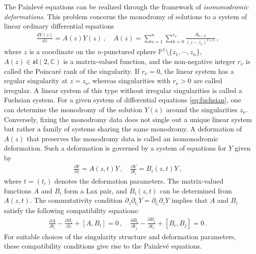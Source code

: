 \documentclass[11pt, a4paper]{article}
\theoremstyle{definition}
\begin{document}
The Painlev\'e equations can be realized through the framework of \emph{isomonodromic deformations}. This problem concerns the monodromy of solutions to a system of linear ordinary differential equations
\begin{align}\label{eq:fuchsian}
    \frac{dY(z)}{dz} = A(z) Y(z) \, , \quad
    A(z) = \sum_{\nu=1}^n \sum_{k=0}^{r_\nu} \frac{A_{\nu,-k}}{(z-z_\nu)^{k+1}} \, ,
\end{align}
where $ z $ is a coordinate on the $ n $-punctured sphere $ \mathbb{P}^1\setminus \{z_1,\cdots,z_n\} $, $ A(z) \in \mathfrak{sl}(2,\mathbb{C}) $ is a matrix-valued function, and the non-negative integer $ r_\nu $ is called the Poincar\'e rank of the singularity. If $ r_\nu=0 $, the linear system has a regular singularity at $ z=z_\nu $, whereas singularities with $ r_\nu>0 $ are called irregular. A linear system of this type without irregular singularities is called a Fuchsian system. For a given system of differential equations \eqref{eq:fuchsian}, one can determine the monodromy of the solution $ Y(z) $ around the singularities $ z_\nu $. Conversely, fixing the monodromy data does not single out a unique linear system but rather a family of systems sharing the same monodromy. A deformation of $ A(z) $ that preserves the monodromy data is called an isomonodromic deformation. Such a deformation is governed by a system of equations for $ Y $ given by \cite{Jimbo:1981tov, Jimbo:1981-2}
\begin{align}\label{eq:isomonodomic}
    \frac{\partial Y}{\partial z} = A(z,t) Y \, , \quad
    \frac{\partial Y}{\partial t_i} = B_i(z,t) Y \, ,
\end{align}
where $ t=(t_i) $ denotes the deformation parameters. The matrix-valued functions $ A $ and $ B_i $ form a Lax pair, and $ B_i(z,t) $ can be determined from $ A(z,t) $. The commutativity condition $ \partial_z \partial_{t_i} Y = \partial_{t_i} \partial_z Y $ implies that $ A $ and $ B_i $ satisfy the following compatibility equations: 
\begin{align}
    \frac{\partial A}{\partial t_i} - \frac{\partial B_i}{\partial z} + [A, B_i] = 0 \, , \quad
    \frac{\partial B_i}{\partial t_j} - \frac{\partial B_j}{\partial t_i} + [B_i, B_j] = 0 \, .
\end{align}
For suitable choices of the singularity structure and deformation parameters, these compatibility conditions give rise to the Painlev\'e equations.
\end{document}
